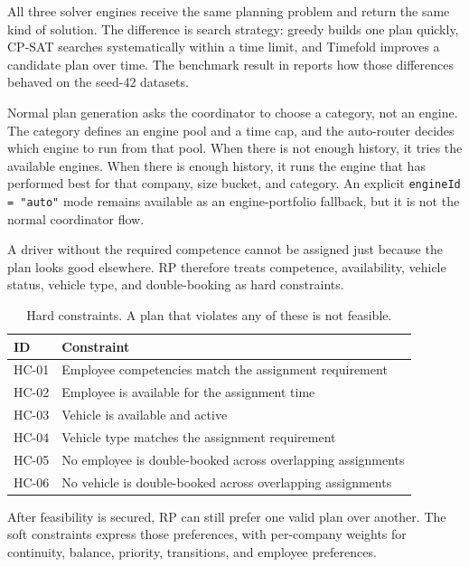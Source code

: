 All three solver engines receive the same planning problem and return the same kind of solution. The difference is search strategy: greedy builds one plan quickly, CP-SAT searches systematically within a time limit, and Timefold improves a candidate plan over time. The benchmark result in  reports how those differences behaved on the seed-42 datasets.

Normal plan generation asks the coordinator to choose a category, not an engine. The category defines an engine pool and a time cap, and the auto-router decides which engine to run from that pool. When there is not enough history, it tries the available engines. When there is enough history, it runs the engine that has performed best for that company, size bucket, and category. An explicit \texttt{engineId = "auto"} mode remains available as an engine-portfolio fallback, but it is not the normal coordinator flow.

A driver without the required competence cannot be assigned just because the plan looks good elsewhere. RP therefore treats competence, availability, vehicle status, vehicle type, and double-booking as hard constraints.

\begin{table}[h]
\centering
\caption{Hard constraints. A plan that violates any of these is not feasible.}
\label{tab:hard-constraints}
\small
\begin{tabularx}{\textwidth}{@{}
  p{}
  X
@{}}
\toprule
\textbf{ID} & \textbf{Constraint} \\
\midrule
HC-01 & Employee competencies match the assignment requirement \\
HC-02 & Employee is available for the assignment time \\
HC-03 & Vehicle is available and active \\
HC-04 & Vehicle type matches the assignment requirement \\
HC-05 & No employee is double-booked across overlapping assignments \\
HC-06 & No vehicle is double-booked across overlapping assignments \\
\bottomrule
\end{tabularx}
\end{table}

After feasibility is secured, RP can still prefer one valid plan over another. The soft constraints express those preferences, with per-company weights for continuity, balance, priority, transitions, and employee preferences.

